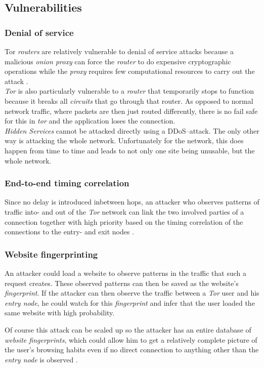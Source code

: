 \documentclass{sig-alternate}
\begin{document}
\subsection{Vulnerabilities}
\subsubsection{Denial of service}
Tor \emph{routers} are relatively vulnerable to denial of service attacks because a malicious
\emph{onion proxy} can force the \emph{router} to do expensive cryptographic operations while
the \emph{proxy} requires few computational resources to carry out the attack \cite{tor2004}.
\\
\emph{Tor} is also particularly vulnerable to a \emph{router} that temporarily stops to function
because it breaks all \emph{circuits} that go through that router. As opposed to normal network
traffic, where packets are then just routed differently, there is no fail safe for this in \emph{tor}
and the application loses the connection.
\\
\emph{Hidden Services} cannot be attacked directly using a DDoS--attack.
The only other way is attacking the whole network.
Unfortunately for the network, this does happen from time to time and leads to not only one site being unusable,
but the whole network\cite{syverson2006}.

\subsubsection{End-to-end timing correlation}
Since no delay is introduced inbetween hops, an attacker who observes patterns of traffic into- and out of the \emph{Tor} network can link the two involved parties of a connection together with high priority based on the timing correlation of the connections to the entry- and exit nodes \cite{tor2004}.

\subsubsection{Website fingerprinting}
An attacker could load a website to observe patterns in the traffic that such a request creates.
These observed patterns can then be saved as the website's \emph{fingerprint}. If the attacker
can then observe the traffic between a \emph{Tor} user and his \emph{entry node}, he could watch
for this \emph{fingerprint} and infer that the user loaded the same website with high probability.

Of course this attack can be scaled up so the attacker has an entire database of \emph{website
fingerprints}, which could allow him to get a relatively complete picture of the user's browsing
habits even if no direct connection to anything other than the \emph{entry node} is observed
\cite{panchenko2011}.
\end{document}
